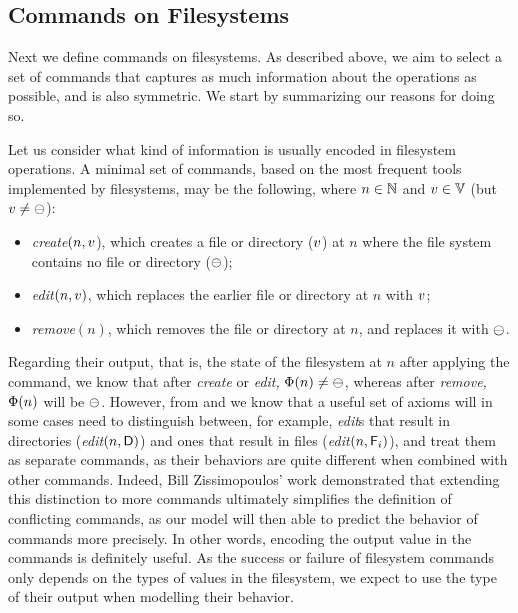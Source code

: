 
\subsection{Commands on Filesystems}


Next we define commands on filesystems.
As described above, we aim to select a set of commands
that captures as much information
about the operations as possible, and is also symmetric.
We start by summarizing our reasons for doing so.


Let us consider what kind of information is usually encoded in filesystem operations.
A minimal set of commands, based on the most frequent tools implemented by filesystems,
may be the following, where 
$n\in\mathbb{N}$ and $v\in\mathbb{V}$ (but $v\neq\ominus$):
\begin{itemize}
\item \textit{create}$(n,v$), which creates a file or directory ($v$) at $n$
where the file system contains no file or directory ($\ominus$);
\item \textit{edit}$(n,v)$, which replaces the earlier file or directory at $n$ with $v$;
\item \textit{remove}$(n)$, which removes the file or directory at $n$, and replaces it with $\ominus$.
\end{itemize}
Regarding their output, that is, the state of the filesystem at $n$
after applying the command,
we know that after \textit{create} or \textit{edit,} $\Phi(n)\neq\ominus$, whereas after \textit{remove,}
$\Phi(n)$ will be $\ominus$. 
However, from \cite{NREC} and \cite{CBNR} we know that a useful set of axioms
will in some cases need to distinguish between, for example,
\textit{edit}s that result in directories (\textit{edit}$(n,\mathsf{D})$) and
ones that result in files (\textit{edit}$(n,\mathsf{F}_i)$), and treat them as separate commands,
as their behaviors are quite different when combined with other commands.
Indeed, Bill Zissimopoulos' work
demonstrated \cite{BZ}
that extending this distinction to more commands ultimately simplifies
the definition of conflicting commands, as our model will then able to predict the behavior of commands
more precisely.
In other words, encoding the output value in the commands is definitely useful.
As the success or failure of filesystem commands only depends on the types of values in the filesystem,
we expect to use the type of their output when modelling their behavior.


